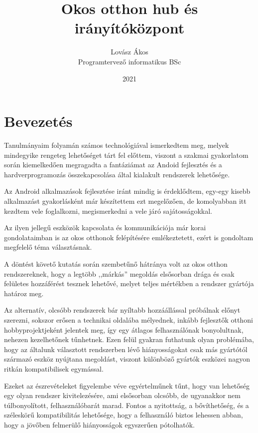 \documentclass[
]{thesis-ekf}
\theoremstyle{definition}
\theoremstyle{remark}
\begin{document}
\title{Okos otthon hub és irányítóközpont}
\author{Lovász Ákos\\Programtervező informatikus BSc}
\date{2021}
\maketitle
\tableofcontents


\chapter*{Bevezetés}
Tanulmányaim folyamán számos technológiával ismerkedtem meg, melyek mindegyike rengeteg
lehetőséget tárt fel előttem, viszont a szakmai gyakorlatom során kiemelkedően megragadta a fantáziámat az Andoid
fejlesztés és a hardverprogramozás összekapcsolása által kialakult rendszerek lehetősége.


Az Android alkalmazások fejlesztése iránt mindig is érdeklődtem, egy-egy kisebb alkalmazást gyakorlásként
már készítettem ezt megelőzően, de komolyabban itt kezdtem vele foglalkozni, megismerkedni a vele járó
sajátosságokkal.


Az ilyen jellegű eszközök kapcsolata és kommunikációja már korai gondolataimban is az okos otthonok felépítésére
emlékeztetett, ezért is gondoltam megfelelő téma választásnak.


A döntést követő kutatás során szembetűnő hátránya volt az okos otthon rendszereknek, hogy a legtöbb ,,márkás''
megoldás elsősorban drága és csak felületes hozzáférést tesznek lehetővé, melyet teljes mértékben a rendszer
gyártója határoz meg. 


Az alternatív, olcsóbb rendszerek bár nyíltabb hozzáállással próbálnak előnyt szerezni,
sokszor erősen a technikai oldalába mélyednek, inkább fejlesztők otthoni hobbyprojektjeként jelentek meg, 
így egy átlagos felhasználónak bonyolultnak, nehezen kezelhetőnek tűnhetnek. Ezen felül gyakran futhatunk 
olyan problémába, hogy az általunk választott rendszerben lévő hiányosságokat csak más gyártótól származó 
eszköz nyújtana megoldást, viszont különböző gyártók eszközei nagyon ritkán kompatibilisek egymással.


Ezeket az észrevételeket figyelembe véve egyértelműnek tűnt, hogy van lehetőség egy olyan rendszer kivitelezésére,
ami elsősorban olcsóbb, de ugyanakkor nem túlbonyolított, felhasználóbarát marad. Fontos a nyitottság, a bővíthetőség,
és a széleskörű kompatibilitás lehetősége, hogy a felhasználó biztos lehessen abban, hogy a jövőben felmerülő
hiányosságok egyszerűen pótolhatók.
\end{document}

